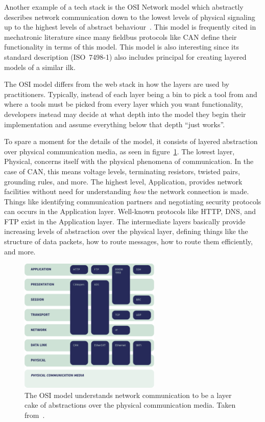 \documentclass[english,12pt,a4paper,pdftex,eng,utf8]{aaltothesis}
\begin{document}
Another example of a tech stack is the OSI Network model which abstractly describes network communication down to the lowest levels of physical signaling up to the highest levels of abstract behaviour~\cite{ISO7498-1}.  This model is frequently cited in mechatronic literature since many fieldbus protocols like CAN define their functionality in terms of this model.  This model is also interesting since its standard description (ISO~7498-1) also includes principal for creating layered models of a similar ilk.

The OSI model differs from the web stack in how the layers are used by practitioners.  Typically, instead of each layer being a bin to pick a tool from and where a tools must be picked from every layer which you want functionality, developers instead may decide at what depth into the model they begin their implementation and assume everything below that depth ``just works''.

To spare a moment for the details of the model, it consists of layered abstraction over physical communication media, as seen in figure~\ref{fig:osi_model}.  The lowest layer, Physical, concerns itself with the physical phenomena of communication.  In the case of CAN, this means voltage levels, terminating resistors, twisted pairs, grounding rules, and more.  The highest level, Application, provides network facilities without need for understanding {\it how\/} the network connection is made.  Things like identifying communication partners and negotiating security protocols can occurs in the Application layer.  Well-known protocols like HTTP, DNS, and FTP exist in the Application layer.  The intermediate layers basically provide increasing levels of abstraction over the physical layer, defining things like the structure of data packets, how to route messages, how to route them efficiently, and more.

\begin{figure}[h]
  \centering
  \includegraphics[width=0.6\textwidth]{assets/osi_model}
  \caption{The OSI model understands network communication to be a layer cake of abstractions over the physical communication media.  Taken from~\cite[§6.1.3]{ISO7498-1}.}\label{fig:osi_model}
\end{figure}
\end{document}

